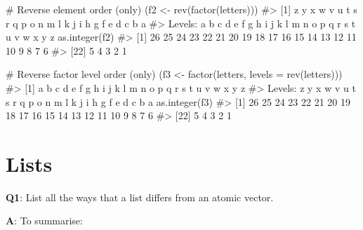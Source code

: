 \documentclass[
]{krantz}
\makeatletter
\newenvironment{Shaded}{\begin{snugshade}}{\end{snugshade}}
\newcommand{\CommentTok}[1]{\textcolor[rgb]{0.56,0.35,0.01}{\textit{#1}}}
\newcommand{\DataTypeTok}[1]{\textcolor[rgb]{0.13,0.29,0.53}{#1}}
\newcommand{\KeywordTok}[1]{\textcolor[rgb]{0.13,0.29,0.53}{\textbf{#1}}}
\newcommand{\NormalTok}[1]{#1}
\newcommand{\StringTok}[1]{\textcolor[rgb]{0.31,0.60,0.02}{#1}}
\newenvironment{kframe}{%
\medskip{}
\setlength{\fboxsep}{.8em}
 \def\at@end@of@kframe{}%
 \ifinner\ifhmode%
  \def\at@end@of@kframe{\end{minipage}}%
  \begin{minipage}{\columnwidth}%
 \fi\fi%
 \def\FrameCommand##1{\hskip\@totalleftmargin \hskip-\fboxsep
 \colorbox{shadecolor}{##1}\hskip-\fboxsep
     \hskip-\linewidth \hskip-\@totalleftmargin \hskip\columnwidth}%
 \MakeFramed {\advance\hsize-\width
   \@totalleftmargin\z@ \linewidth\hsize
   \@setminipage}}%
 {\par\unskip\endMakeFramed%
 \at@end@of@kframe}
\renewenvironment{Shaded}{\begin{kframe}}{\end{kframe}}
\renewcommand{\KeywordTok} [1]{\textcolor[rgb]{0.00,0.44,0.13}{{#1}}}
\renewcommand{\DataTypeTok}[1]{\textcolor[rgb]{0.56,0.13,0.00}{{#1}}}
\renewcommand{\StringTok}  [1]{\textcolor[rgb]{0.25,0.44,0.63}{{#1}}}
\renewcommand{\CommentTok} [1]{\textcolor[rgb]{0.38,0.63,0.69}{{#1}}}
\renewcommand{\NormalTok}  [1]{{#1}}
\makeatother
\begin{document}
\begin{Shaded}
\begin{Highlighting}[]
\CommentTok{# Reverse element order (only)}
\NormalTok{(f2 <-}\StringTok{ }\KeywordTok{rev}\NormalTok{(}\KeywordTok{factor}\NormalTok{(letters)))}
\CommentTok{#>  [1] z y x w v u t s r q p o n m l k j i h g f e d c b a}
\CommentTok{#> Levels: a b c d e f g h i j k l m n o p q r s t u v w x y z}
\KeywordTok{as.integer}\NormalTok{(f2)}
\CommentTok{#>  [1] 26 25 24 23 22 21 20 19 18 17 16 15 14 13 12 11 10  9  8  7  6}
\CommentTok{#> [22]  5  4  3  2  1}

\CommentTok{# Reverse factor level order (only)}
\NormalTok{(f3 <-}\StringTok{ }\KeywordTok{factor}\NormalTok{(letters, }\DataTypeTok{levels =} \KeywordTok{rev}\NormalTok{(letters)))}
\CommentTok{#>  [1] a b c d e f g h i j k l m n o p q r s t u v w x y z}
\CommentTok{#> Levels: z y x w v u t s r q p o n m l k j i h g f e d c b a}
\KeywordTok{as.integer}\NormalTok{(f3)}
\CommentTok{#>  [1] 26 25 24 23 22 21 20 19 18 17 16 15 14 13 12 11 10  9  8  7  6}
\CommentTok{#> [22]  5  4  3  2  1}
\end{Highlighting}
\end{Shaded}

\hypertarget{lists}{%
\section{Lists}\label{lists}}

\textbf{{Q1}}: List all the ways that a list differs from an atomic vector.

\textbf{{A}}: To summarise:
\end{document}
